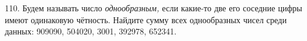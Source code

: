 110. Будем называть число {\it однообразным,} если какие-то две его соседние цифры имеют одинаковую чётность. Найдите сумму всех однообразных чисел среди данных: 909090, 504020, 3001, 392978, 652341.\\
